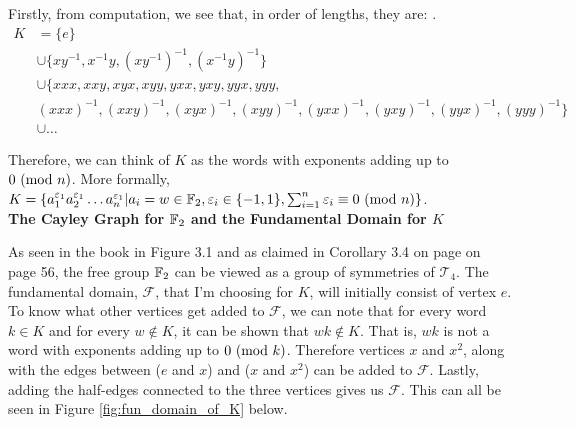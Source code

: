 Firstly, from computation, we see that, in order of lengths, they are: . 
\begin{align*}
K
&=\{e\} \\
&\cup\{xy^{-1}, x^{-1}y, (xy^{-1})^{-1}, (x^{-1}y)^{-1}\} \\
&\cup\{xxx,xxy,xyx,xyy,yxx,yxy,yyx,yyy, \\
&(xxx)^{-1},(xxy)^{-1},(xyx)^{-1},(xyy)^{-1},(yxx)^{-1},(yxy)^{-1},(yyx)^{-1},(yyy)^{-1}\} \\
&\cup \ldots
\end{align*}


Therefore, we can think of $K$ as the words with exponents adding up to $0 \ (\mathrm{mod}\ n)$. More formally, $K=\{a_{1}^{\varepsilon_1}a_{2}^{\varepsilon_1}\ldots a_{n}^{\varepsilon_1} | a_i=w\in \mathbb{F}_2, \varepsilon_i\in \{-1, 1\}, \sum_{i=1}^{n} \varepsilon_i \equiv 0 \ (\mathrm{mod}\ n)\}$. \\

\textbf{The Cayley Graph for $\mathbb{F}_2$ and the Fundamental Domain for $K$}

As seen in the book in Figure 3.1 and as claimed in Corollary 3.4 on page on page 56, the free group $\mathbb{F}_2$ can be viewed as a group of symmetries of $\mathcal{T}_4$. The fundamental domain, $\mathcal{F}$, that I'm choosing for $K$, will initially consist of vertex $e$. To know what other vertices get added to $\mathcal{F}$, we can note that for every word $k\in K$ and for every $w\not\in K$, it can be shown that $wk\not\in K$. That is, $wk$ is not a word with exponents adding up to $0\ (\mathrm{mod}\ k)$. Therefore vertices $x$ and $x^2$, along with the edges between ($e$ and $x$) and ($x$ and $x^2$) can be added to $\mathcal{F}$. Lastly, adding the half-edges connected to the three vertices gives us $\mathcal{F}$. This can all be seen in Figure \ref{fig:fun_domain_of_K} below.

